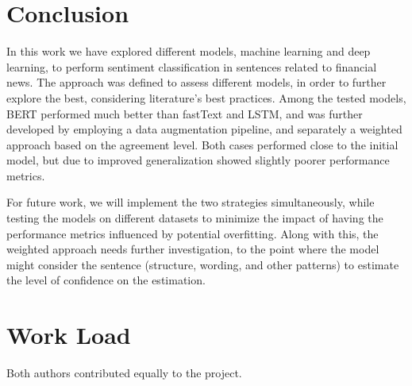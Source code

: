 \documentclass[conference]{IEEEtran}
\begin{document}
\section{Conclusion}

In this work we have explored different models, machine learning and deep learning, to perform sentiment classification in sentences related to financial news. The approach was defined to assess different models, in order to further explore the best, considering literature's best practices. Among the tested models, BERT performed much better than fastText and LSTM, and was further developed by employing a data augmentation pipeline, and separately a weighted approach based on the agreement level. Both cases performed close to the initial model, but due to improved generalization showed slightly poorer performance metrics.

For future work, we will implement the two strategies simultaneously, while testing the models on different datasets to minimize the impact of having the performance metrics influenced by potential overfitting. Along with this, the weighted approach needs further investigation, to the point where the model might consider the sentence (structure, wording, and other patterns) to estimate the level of confidence on the estimation.

\section*{Work Load}

Both authors contributed equally to the project.



\end{document}
